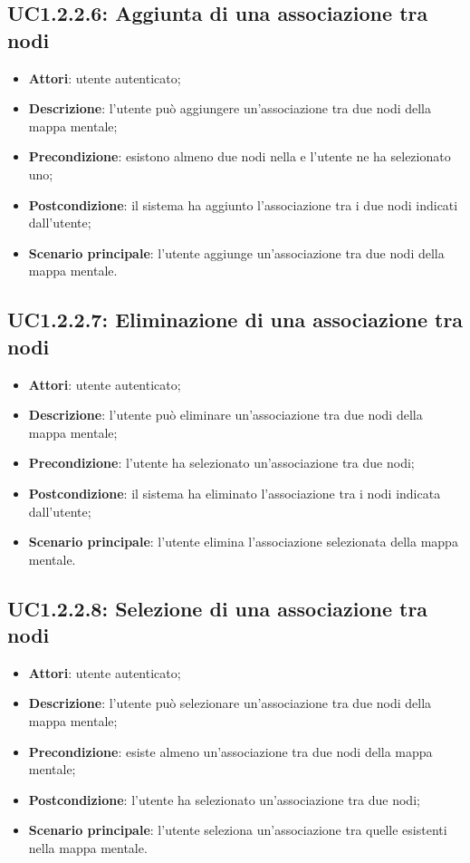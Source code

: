 \subsection{UC1.2.2.6: Aggiunta di una associazione tra nodi}
\label{UC1.2.2.6}
\begin{itemize}
\item \textbf{Attori}: utente autenticato;
\item \textbf{Descrizione}: l'utente può aggiungere un'associazione tra due nodi della mappa mentale;
\item \textbf{Precondizione}: esistono almeno due nodi nella  e l'utente ne ha selezionato uno;
\item \textbf{Postcondizione}: il sistema ha aggiunto l'associazione tra i due nodi indicati dall'utente;
\item \textbf{Scenario principale}:
l'utente aggiunge un'associazione tra due nodi della mappa mentale.
\end{itemize}
\subsection{UC1.2.2.7: Eliminazione di una associazione tra nodi}
\label{UC1.2.2.7}
\begin{itemize}
\item \textbf{Attori}: utente autenticato;
\item \textbf{Descrizione}: l'utente può eliminare un'associazione tra due nodi della mappa mentale;
\item \textbf{Precondizione}: l'utente ha selezionato un'associazione tra due nodi;
\item \textbf{Postcondizione}: il sistema ha eliminato l'associazione tra i nodi indicata dall'utente;
\item \textbf{Scenario principale}:
l'utente elimina l'associazione selezionata della mappa mentale.
\end{itemize}
\subsection{UC1.2.2.8: Selezione di una associazione tra nodi}
\label{UC1.2.2.8}
\begin{itemize}
\item \textbf{Attori}: utente autenticato;
\item \textbf{Descrizione}: l'utente può selezionare un'associazione tra due nodi della mappa mentale;
\item \textbf{Precondizione}: esiste almeno un'associazione tra due nodi della mappa mentale;
\item \textbf{Postcondizione}: l'utente ha selezionato un'associazione tra due nodi;
\item \textbf{Scenario principale}:
l'utente seleziona un'associazione tra quelle esistenti nella mappa mentale.
\end{itemize}
